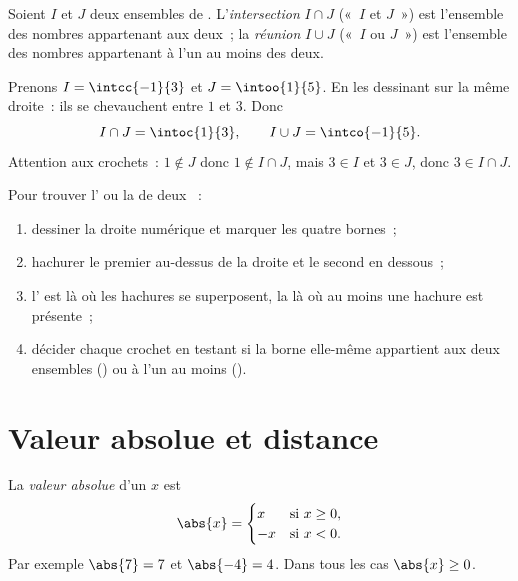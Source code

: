 \begin{definition}\label{def:g10:numbers:interunion}
Soient $I$ et $J$ deux ensembles de .
L'\emph{intersection} $I \cap J$ («~$I$ et $J$~»)
est l'ensemble des nombres appartenant aux deux~; la
\emph{réunion} $I \cup J$ («~$I$ ou $J$~») est
l'ensemble des nombres appartenant à l'un au moins des deux.
\end{definition}

\begin{example}\label{ex:g10:numbers:interunion}
Prenons $I = \intcc{-1}{3}$ et $J = \intoo{1}{5}$. En les dessinant sur
la même droite~: ils se chevauchent entre $1$ et $3$. Donc
\[
I \cap J = \intoc{1}{3},
\qquad
I \cup J = \intco{-1}{5}.
\]
Attention aux crochets~: $1 \notin J$ donc $1 \notin I \cap J$, mais
$3 \in I$ et $3 \in J$, donc $3 \in I \cap J$.
\end{example}

\begin{method}\label{met:g10:numbers:intervals}
Pour trouver l' ou la  de deux ~:
\begin{enumerate}
  \item dessiner la droite numérique et marquer les quatre bornes~;
  \item hachurer le premier  au-dessus de la droite et le
        second en dessous~;
  \item l' est là où les hachures se superposent, la
         là où au moins une hachure est présente~;
  \item décider chaque crochet en testant si la borne elle-même
        appartient aux deux ensembles () ou à l'un au
        moins ().
\end{enumerate}
\end{method}

\section{Valeur absolue et distance}

\begin{definition}\label{def:g10:numbers:abs}
La \emph{valeur absolue} d'un  $x$
est
\[
\abs{x} =
\begin{cases}
x & \text{si } x \geq 0, \\
-x & \text{si } x < 0.
\end{cases}
\]
Par exemple $\abs{7} = 7$ et $\abs{-4} = 4$. Dans tous les cas
$\abs{x} \geq 0$.
\end{definition}

